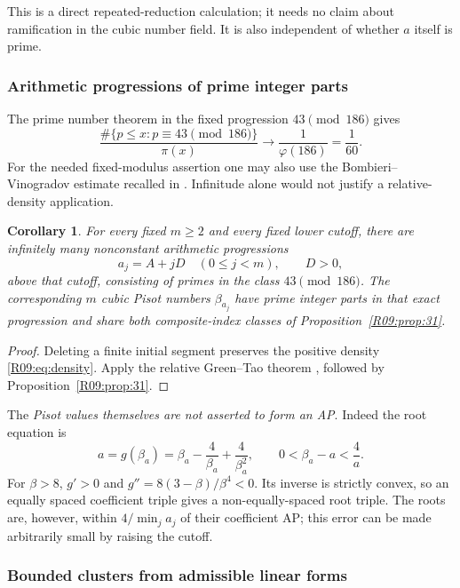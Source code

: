 \documentclass[11pt,a4paper]{article}
\newtheorem{corollary}[theorem]{Corollary}\newtheorem{mainthm}[theorem]{Theorem}
\theoremstyle{definition}\newtheorem{definition}[theorem]{Definition}
\theoremstyle{remark}\newtheorem{remark}[theorem]{Remark}
\begin{document}
This is a direct repeated-reduction calculation; it needs no claim
about ramification in the cubic number field. It is also independent
of whether $a$ itself is prime.

\subsubsection{Arithmetic progressions of prime integer parts}

The prime number theorem in the fixed progression $43\pmod{186}$ gives
\begin{equation}\label{R09:eq:density}
 \frac{\#\{p\le x:p\equiv43\pmod{186}\}}{\pi(x)}
 \longrightarrow \frac1{\varphi(186)}=\frac1{60}.
\end{equation}
For the needed fixed-modulus assertion one may also use the
Bombieri--Vinogradov estimate recalled in \cite[\S1]{Maynard}.
Infinitude alone would not justify a relative-density application.

\begin{corollary}\label{R09:cor:gt}
For every fixed $m\ge2$ and every fixed lower cutoff, there are infinitely
many nonconstant arithmetic progressions
\[
 a_j=A+jD\quad(0\le j<m),\qquad D>0,
\]
above that cutoff, consisting of primes in the class $43\pmod{186}$.
The corresponding $m$ cubic Pisot numbers $\beta_{a_j}$ have prime
integer parts in that exact progression and share both composite-index
classes of Proposition~\ref{R09:prop:31}.
\end{corollary}
\begin{proof}
Deleting a finite initial segment preserves the positive density
\eqref{R09:eq:density}. Apply the relative Green--Tao theorem
\cite[Theorem 1.2]{GreenTao}, followed by Proposition~\ref{R09:prop:31}.
\end{proof}

The \emph{Pisot values themselves are not asserted to form an AP}.
Indeed the root equation is
\[
 a=g(\beta_a)=\beta_a-\frac4{\beta_a}+\frac4{\beta_a^2},
 \qquad 0<\beta_a-a<\frac4a.
\]
For $\beta>8$, $g'>0$ and $g''=8(3-\beta)/\beta^4<0$.
Its inverse is strictly convex, so an equally spaced coefficient
triple gives a non-equally-spaced root triple. The roots are, however,
within $4/\min_j a_j$ of their coefficient AP; this error can be made
arbitrarily small by raising the cutoff.

\subsubsection{Bounded clusters from admissible linear forms}
\end{document}
